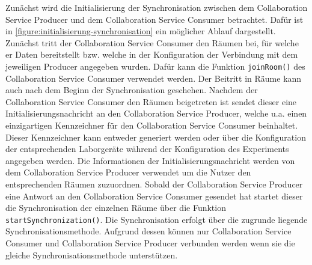 Zunächst wird die Initialisierung der Synchronisation zwischen dem Collaboration Service Producer und dem Collaboration Service Consumer betrachtet. Dafür ist in \autoref{figure:initialisierung-synchronisation} ein möglicher Ablauf dargestellt. Zunächst tritt der Collaboration Service Consumer den Räumen bei, für welche er Daten bereitstellt bzw. welche in der Konfiguration der Verbindung mit dem jeweiligen Producer angegeben wurden. Dafür kann die Funktion \texttt{joinRoom()} des Collaboration Service Consumer verwendet werden. Der Beitritt in Räume kann auch nach dem Beginn der Synchronisation geschehen. Nachdem der Collaboration Service Consumer den Räumen beigetreten ist sendet dieser eine Initialisierungsnachricht an den Collaboration Service Producer, welche u.a. einen einzigartigen Kennzeichner für den Collaboration Service Consumer beinhaltet. Dieser Kennzeichner kann entweder generiert werden oder über die Konfiguration der entsprechenden Laborgeräte während der Konfiguration des Experiments angegeben werden. Die Informationen der Initialisierungsnachricht werden von dem Collaboration Service Producer verwendet um die Nutzer den entsprechenden Räumen zuzuordnen. Sobald der Collaboration Service Producer eine Antwort an den Collaboration Service Consumer gesendet hat startet dieser die Synchronisation der einzelnen Räume über die Funktion \texttt{startSynchronization()}. Die Synchronisation erfolgt über die zugrunde liegende Synchronisationsmethode. Aufgrund dessen können nur Collaboration Service Consumer und Collaboration Service Producer verbunden werden wenn sie die gleiche Synchronisationsmethode unterstützen.

